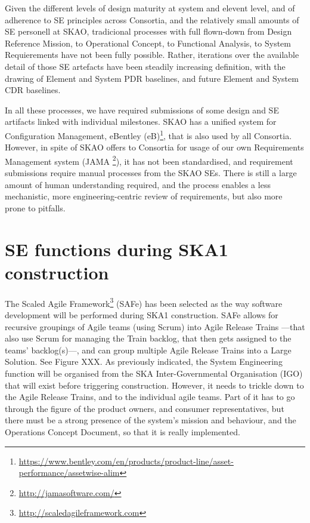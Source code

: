 \documentclass[11pt,twoside]{article}
\begin{document}
Given the different levels of design maturity at system and elevent level, and of adherence to SE principles across Consortia, and the relatively small amounts of SE personell at SKAO, tradicional processes with full flown-down from Design Reference Mission, to Operational Concept, to Functional Analysis, to System Requierements have not been fully possible. Rather, iterations over the available detail of those SE artefacts have been steadily increasing definition, with the drawing of Element and System PDR baselines, and future Element and System CDR baselines.

In all these processes, we have required submissions of some design and SE artifacts linked with individual milestones. SKAO has a unified system for Configuration Management, eBentley (eB)\footnote{\url{https://www.bentley.com/en/products/product-line/asset-performance/assetwise-alim}}, that is also used by all Consortia. However, in spite of SKAO offers to Consortia for usage of our own Requirements Management system (JAMA \footnote{\url{http://jamasoftware.com/}}), it has not been standardised, and requirement submissions require manual processes from the SKAO SEs. There is still a large amount of human understanding required, and the process enables a less mechanistic, more engineering-centric review of requirements, but also more prone to pitfalls.


\section{SE functions during SKA1 construction} %
\label{sec:se_functions_during_ska1_construction}
The Scaled Agile Framework\footnote{\url{http://scaledagileframework.com}} (SAFe) has been selected as the way software development will be performed during SKA1 construction. SAFe allows for recursive groupings of Agile teams (using Scrum) into Agile Release Trains ---that also use Scrum for managing the Train backlog, that then gets assigned to the teams' backlog(s)---, and can group multiple Agile Release Trains into a Large Solution. See Figure XXX.
As previously indicated, the System Engineering function will be organised from the SKA Inter-Governmental Organisation (IGO) that will exist before triggering construction. However, it needs to trickle down to the Agile Release Trains, and to the individual agile teams.	
Part of it has to go through the figure of the product owners, and consumer representatives, but there must be a strong presence of the system's mission and behaviour, and the Operations Concept Document, so that it is really implemented.	
\end{document}
